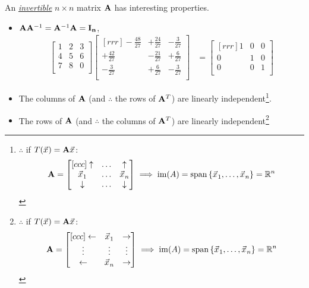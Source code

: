 \documentclass{article}%
\begin{document}
\begin{multicols}{2}
An {\em \href{https://en.wikipedia.org/wiki/Invertible_matrix}{invertible}} $n \times n$ matrix $\mathbf{A}$ has interesting properties.
\begin{itemize}
\item $\mathbf{A}\mathbf{A}^{-1} = \mathbf{A}^{-1}\mathbf{A} = \mathbf{I_{n}}$, \eg
\begin{align}
 \begin{bmatrix} 1& 2& 3\\ 4& 5& 6\\ 7& 8& 0\\ \end{bmatrix} \begin{bmatrix}[rrr]
-\frac{48}{27}& +\frac{24}{27}& -\frac{3}{27}\\ +\frac{42}{27}& -\frac{21}{27}& +\frac{6}{27}\\ -\frac{3}{27}& +\frac{6}{27}& -\frac{3}{27}\\
\end{bmatrix} &=\begin{bmatrix}[rrr] 1& 0& 0\\ 0& 1& 0\\ 0& 0& 1\\\end{bmatrix}
\end{align}
  \item The columns of $\mathbf{A}$ (and $\therefore$ the rows of $\mathbf{A}^T$) are linearly independent\footnote{$\therefore$ if $T(\vecx) = \matA\vecx$:
\begin{align}
  \matA = \begin{bmatrix}[ccc] \uparrow&\dots&\uparrow \\ \vecx_1&\dots&\vecx_n \\ \downarrow&\dots&\downarrow \\ \end{bmatrix} \implies \imag(A) = \spn\left\{ \vecx_1,\dots,\vecx_n \right\} = \RRN
\end{align}}.
  \item The rows of $\mathbf{A}$ (and $\therefore$ the columns of $\mathbf{A}^T$) are linearly independent\footnote{$\therefore$ if $T(\vecx) = \matA\vecx$:
\begin{align}
  \matA = \begin{bmatrix}[ccc] \leftarrow&\vecx_1&\rightarrow \\ \vdots&\vdots&\vdots \\ \leftarrow&\vecx_n&\rightarrow \\ \end{bmatrix} \implies \imag(A) = \spn\left\{ \vecx_1,\dots,\vecx_n \right\} = \RRN

\end{align}}
\end{itemize}
\end{multicols}
\end{document}
